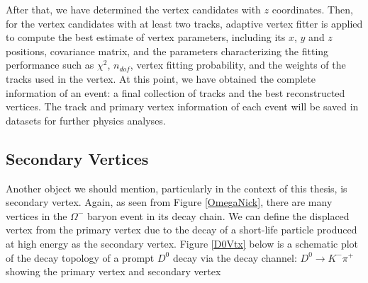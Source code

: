 After that, we have determined the vertex candidates with $z$ coordinates. Then,  for the vertex candidates with at least two tracks, adaptive vertex fitter \cite{AVT} is applied to compute the best estimate of vertex parameters, including its $x$, $y$ and $z$ positions, covariance matrix, and the parameters characterizing the fitting performance such as $\chi^2$, $n_{dof}$, vertex fitting probability, and the weights of the tracks used in the vertex. At this point, we have obtained the complete information of an event: a final collection of tracks and the best reconstructed vertices. The track and primary vertex information of each event will be saved in datasets for further physics analyses.

\subsection{Secondary Vertices}

Another object we should mention, particularly in the context of this thesis, is secondary vertex. Again, as seen from Figure \ref{OmegaNick}, there are many vertices in the $\Omega^-$ baryon event in its decay chain. We can define the displaced vertex from the primary vertex due to the decay of a short-life particle produced at high energy as the secondary vertex. Figure \ref{D0Vtx} below is a schematic plot of the decay topology of a prompt $D^0$ decay via the decay channel: $D^0 \rightarrow K^- \pi^+$ showing the primary vertex and secondary vertex  


